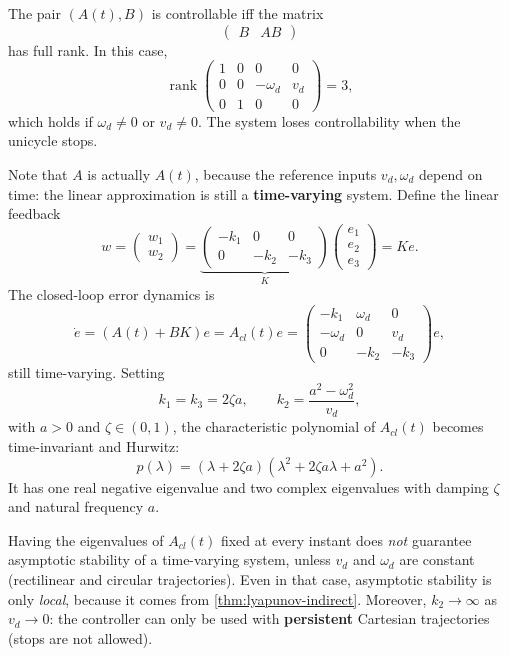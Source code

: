 The pair \( (A(t), B) \) is controllable iff the matrix
\[
\begin{pmatrix} B & A B \end{pmatrix}
\]
has full rank. In this case,
\[
\operatorname{rank}
\begin{pmatrix}
    1 & 0 & 0 & 0 \\
    0 & 0 & -\omega_d & v_d \\
    0 & 1 & 0 & 0
\end{pmatrix}
= 3,
\]
which holds if \( \omega_d \neq 0 \) or \( v_d \neq 0 \). The system
loses controllability when the unicycle stops.

Note that \( A \) is actually \( A(t) \), because the reference inputs
\( v_d, \omega_d \) depend on time: the linear approximation is still
a \textbf{time-varying} system. Define the linear feedback
\[
w = \begin{pmatrix} w_1 \\ w_2 \end{pmatrix}
  = \underbrace{
    \begin{pmatrix}
        -k_1 & 0 & 0 \\
        0 & -k_2 & -k_3
    \end{pmatrix}}_{K}
    \begin{pmatrix} e_1 \\ e_2 \\ e_3 \end{pmatrix}
  = K e.
\]
The closed-loop error dynamics is
\[
\dot{e} = (A(t) + BK) e = A_{cl}(t) e =
\begin{pmatrix}
    -k_1 & \omega_d & 0 \\
    -\omega_d & 0 & v_d \\
    0 & -k_2 & -k_3
\end{pmatrix} e,
\]
still time-varying. Setting
\[
k_1 = k_3 = 2 \zeta a, \qquad
k_2 = \frac{a^2 - \omega_d^2}{v_d},
\]
with \( a > 0 \) and \( \zeta \in (0, 1) \), the characteristic
polynomial of \( A_{cl}(t) \) becomes time-invariant and Hurwitz:
\[
p(\lambda) = (\lambda + 2 \zeta a)
             (\lambda^2 + 2 \zeta a \lambda + a^2).
\]
It has one real negative eigenvalue and two complex eigenvalues with
damping \( \zeta \) and natural frequency \( a \).

\begin{nb}
Having the eigenvalues of \( A_{cl}(t) \) fixed at every instant does
\emph{not} guarantee asymptotic stability of a time-varying system,
unless \( v_d \) and \( \omega_d \) are constant (rectilinear and
circular trajectories). Even in that case, asymptotic stability is
only \emph{local}, because it comes from \cref{thm:lyapunov-indirect}.
Moreover, \( k_2 \to \infty \) as \( v_d \to 0 \): the controller can
only be used with \textbf{persistent} Cartesian trajectories (stops
are not allowed).
\end{nb}

